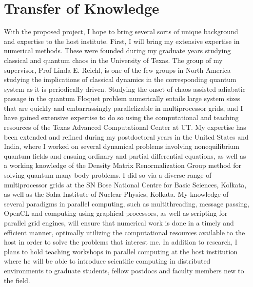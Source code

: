 \documentclass[a4paper,9pt]{article}
\begin{document}
\section{Transfer of Knowledge}
\label{sec:training}

With the proposed project, I hope to bring several sorts of unique background and expertise to the host institute. First, I will bring my extensive expertise in numerical methods. These were founded during my graduate years studying classical and quantum chaos in the University of Texas. The group of my supervisor, Prof Linda E. Reichl, is one of the few groups in North America studying the implications of classical dynamics in the corresponding quantum system as it is periodically driven. Studying the onset of chaos assisted adiabatic passage in the quantum Floquet problem numerically entails large system sizes that are quickly and embarrassingly parallelizable in multiprocessor grids, and I have gained extensive expertise to do so using the computational and teaching resources of the Texas Advanced Computational Center at UT. My expertise has been extended and refined during my postdoctoral years in the United States and India, where I worked on several dynamical problems involving nonequilibrium quantum fields and ensuing ordinary and partial differential equations, as well as a working knowledge of the Density Matrix Renormalization Group method for solving quantum many body problems. I did so via a diverse range of multiprocessor grids at the SN Bose National Centre for Basic Sciences, Kolkata, as well as the Saha Institute of Nuclear Physics, Kolkata. My knowledge of several paradigms in parallel computing, such as multithreading, message passing, OpenCL and computing using graphical processors, as well as scripting for parallel grid engines, will ensure that numerical work is done in a timely and efficient manner, optimally utilizing the computational resources available to the host in order to solve the problems that interest me. In addition to research, I plans to hold teaching workshops in parallel computing at the host institution where he will be able to introduce scientific computing in distributed environments to graduate students, fellow postdocs and faculty members new to the field.
\end{document}
